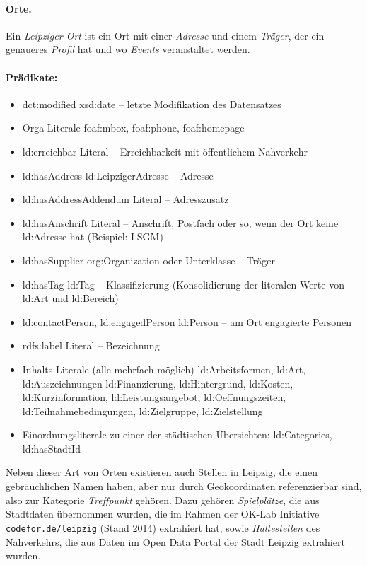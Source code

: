 \documentclass[a4paper,11pt]{article}
\begin{document}
\paragraph{Orte.} 
Ein \emph{Leipziger Ort} ist ein Ort mit einer \emph{Adresse} und einem
\emph{Träger}, der ein genaueres \emph{Profil} hat und wo \emph{Events}
veranstaltet werden.

\paragraph{Prädikate:}
\begin{itemize}
\item dct:modified xsd:date – letzte Modifikation des Datensatzes
\item Orga-Literale foaf:mbox, foaf:phone, foaf:homepage
\item ld:erreichbar Literal – Erreichbarkeit mit öffentlichem Nahverkehr
\item ld:hasAddress ld:LeipzigerAdresse – Adresse
\item ld:hasAddressAddendum Literal – Adresszusatz
\item ld:hasAnschrift Literal – Anschrift, Postfach oder so, wenn der Ort
  keine ld:Adresse hat (Beispiel: LSGM)
\item ld:hasSupplier org:Organization oder Unterklasse – Träger
\item ld:hasTag ld:Tag – Klassifizierung (Konsolidierung der literalen Werte
  von ld:Art und ld:Bereich)
\item ld:contactPerson, ld:engagedPerson ld:Person – am Ort engagierte
  Personen
\item rdfs:label Literal – Bezeichnung
\item Inhalts-Literale (alle mehrfach möglich) ld:Arbeitsformen, ld:Art,
  ld:Auszeichnungen ld:Finanzierung, ld:Hintergrund, ld:Kosten,
  ld:Kurzinformation, ld:Leistungsangebot, ld:Oeffnungszeiten,
  ld:Teilnahmebedingungen, ld:Zielgruppe, ld:Zielstellung
\item Einordnungsliterale zu einer der städtischen Übersichten: ld:Categories,
  ld:hasStadtId
\end{itemize}

Neben dieser Art von Orten existieren auch Stellen in Leipzig, die einen
gebräuchlichen Namen haben, aber nur durch Geokoordinaten referenzierbar sind,
also zur Kategorie \emph{Treffpunkt} gehören. Dazu gehören \emph{Spielplätze},
die aus Stadtdaten übernommen wurden, die im Rahmen der OK-Lab Initiative
\texttt{codefor.de/leipzig} (Stand 2014) extrahiert hat, sowie
\emph{Haltestellen} des Nahverkehrs, die aus Daten im Open Data Portal der
Stadt Leipzig extrahiert wurden. 
\end{document}
